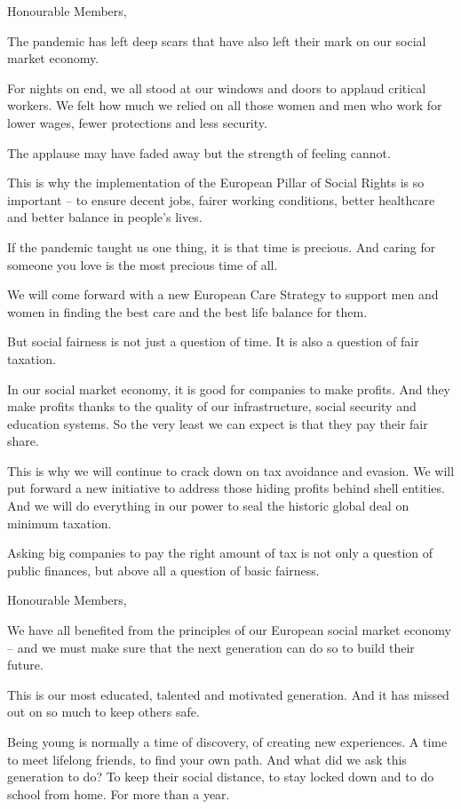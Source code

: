 \documentclass[a4paper,11pt]{article}
\begin{document}
 

Honourable Members,

The pandemic has left deep scars that have also left their mark on our social market economy.

For nights on end, we all stood at our windows and doors to applaud critical workers. We felt how much we relied on all those women and men who work for lower wages, fewer protections and less security. 

The applause may have faded away but the strength of feeling cannot.

This is why the implementation of the European Pillar of Social Rights is so important – to ensure decent jobs, fairer working conditions, better healthcare and better balance in people's lives.

If the pandemic taught us one thing, it is that time is precious. And caring for someone you love is the most precious time of all.

We will come forward with a new European Care Strategy to support men and women in finding the best care and the best life balance for them.

But social fairness is not just a question of time. It is also a question of fair taxation.

In our social market economy, it is good for companies to make profits. And they make profits thanks to the quality of our infrastructure, social security and education systems.  So the very least we can expect is that they pay their fair share.

This is why we will continue to crack down on tax avoidance and evasion.
We will put forward a new initiative to address those hiding profits behind shell entities.
And we will do everything in our power to seal the historic global deal on minimum taxation.

Asking big companies to pay the right amount of tax is not only a question of public finances, but above all a question of basic fairness.

 

Honourable Members,

We have all benefited from the principles of our European social market economy – and we must make sure that the next generation can do so to build their future.

This is our most educated, talented and motivated generation. And it has missed out on so much to keep others safe.

Being young is normally a time of discovery, of creating new experiences. A time to meet lifelong friends, to find your own path.  And what did we ask this generation to do? To keep their social distance, to stay locked down and to do school from home. For more than a year.
\end{document}
